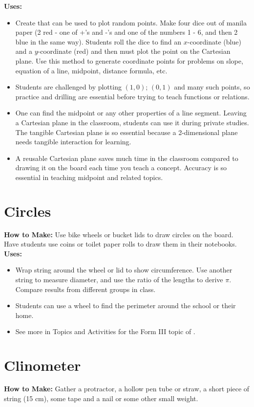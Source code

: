 \noindent\textbf{Uses:}
\begin{itemize}
\item Create  that can be used to plot random points. Make four dice out of manila paper (2 red - one of +'s and -'s and one of the numbers 1 - 6, and then 2 blue in the same way). Students roll the dice to find an $x$-coordinate (blue) and a $y$-coordinate (red) and then must plot the point on the Cartesian plane. Use this method to generate coordinate points for problems on slope, equation of a line, midpoint, distance formula, etc.
\item Students are challenged by plotting $(1,0)$; $(0,1)$ and many such points, so practice and drilling are essential before trying to teach functions or relations.
\item One can find the midpoint or any other properties of a line segment. Leaving a Cartesian plane in the classroom, students can use it during private studies. The tangible Cartesian plane is so essential because a 2-dimensional plane needs tangible interaction for learning.
\item A reusable Cartesian plane saves much time in the classroom compared to drawing it on the board each time you teach a concept. Accuracy is so essential in teaching midpoint and related topics.
\end{itemize}

\section{Circles} \label{circlestools}
\textbf{How to Make:} Use bike wheels or bucket lids to draw circles on the board. Have students use coins or toilet paper rolls to draw them in their notebooks.\\

\noindent\textbf{Uses:}
\begin{itemize}
\item Wrap string around the wheel or lid to show circumference. Use another string to measure diameter, and use the ratio of the lengths to derive $\pi$. Compare results from different groups in class.
\item Students can use a wheel to find the perimeter around the school or their home.
\item See more in Topics and Activities for the Form III topic of .
\end{itemize}

\section{Clinometer} \label{clinometer}
\textbf{How to Make:} Gather a protractor, a hollow pen tube or straw, a short piece of string (15 cm), some tape and a nail or some other small weight.


